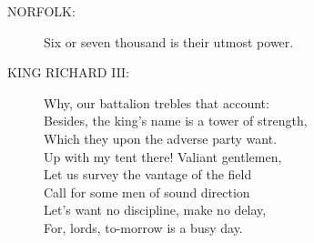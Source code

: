 \documentclass{article}
\begin{document}
\begin{description}
\item[NORFOLK:] 
\hspace{1pt}Six or seven thousand is their utmost power.\\
\end{description}
\begin{description}
\item[KING RICHARD III:] 
\hspace{1pt}Why, our battalion trebles that account:\\
\hspace{1pt}Besides, the king's name is a tower of strength,\\
\hspace{1pt}Which they upon the adverse party want.\\
\hspace{1pt}Up with my tent there! Valiant gentlemen,\\
\hspace{1pt}Let us survey the vantage of the field\\
\hspace{1pt}Call for some men of sound direction\\
\hspace{1pt}Let's want no discipline, make no delay,\\
\hspace{1pt}For, lords, to-morrow is a busy day.\\
\end{description}
\centering{\it [Exeunt]}\\
\\
\end{document}

